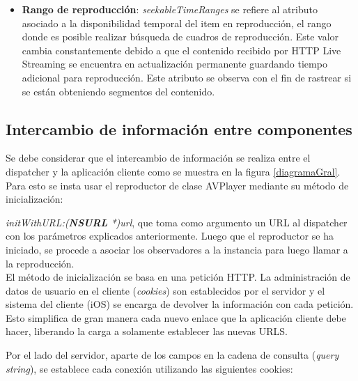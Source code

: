 \begin{itemize}
\item \textbf{Rango de reproducción}: \textit{seekableTimeRanges} se refiere al atributo asociado a la disponibilidad temporal del item en reproducción, el rango donde es posible realizar búsqueda de cuadros de reproducción. Este valor cambia constantemente debido a que el contenido recibido por HTTP Live Streaming se encuentra en actualización permanente guardando tiempo adicional para reproducción. Este atributo se observa con el fin de rastrear si se están obteniendo segmentos del contenido.
\end{itemize}
\label{item:seekableTimeRanges}
\label{item:kvo-tracks}
		
\subsection{Intercambio de información entre componentes}
\label{subsec:cookies}

Se debe considerar que el intercambio de información se realiza entre el dispatcher y la aplicación cliente como se muestra en la figura \ref{diagramaGral}. Para esto se insta usar el reproductor de clase AVPlayer mediante su método de inicialización:

\textit{initWithURL:(\textbf{NSURL} *)url}, que toma como argumento un URL al dispatcher con los parámetros explicados anteriormente. Luego que el reproductor se ha iniciado, se procede a asociar los observadores a la instancia para luego llamar a la reproducción.\\

El método de inicialización se basa en una petición HTTP. La administración de datos de usuario en el cliente (\textit{cookies}) son establecidos por el servidor y el sistema del cliente (iOS) se encarga de devolver la información con cada petición. Esto simplifica de gran manera cada nuevo enlace que la aplicación cliente debe hacer, liberando la carga a solamente establecer las nuevas URLS.

Por el lado del servidor, aparte de los campos en la cadena de consulta (\textit{query string}), se establece cada conexión utilizando las siguientes cookies:


